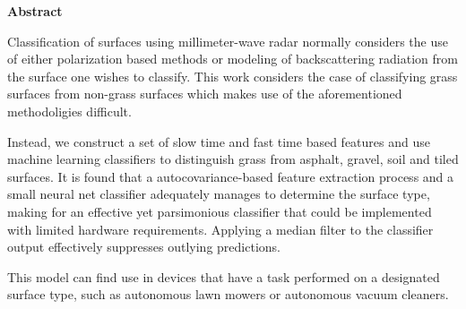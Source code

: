 \newenvironment{abstract}%
    {\cleardoublepage\thispagestyle{empty}\null\vfill\begin{center}%
    \bfseries{\textsf{Abstract}}\end{center}}%
    {\vfill\null}
\begin{abstract}
Classification of surfaces using millimeter-wave radar normally considers the use of either polarization based methods or modeling of backscattering radiation from the surface one wishes to classify. This work considers the case of classifying grass surfaces from non-grass surfaces which makes use of the aforementioned methodoligies difficult. %
		
Instead, we construct a set of slow time and fast time based features and use machine learning classifiers to distinguish grass from asphalt, gravel, soil and tiled surfaces. It is found that a autocovariance-based feature extraction process and a small neural net classifier adequately manages to determine the surface type, making for an effective yet parsimonious classifier that could be implemented with limited hardware requirements. Applying a median filter to the classifier output effectively suppresses outlying predictions.

This model can find use in devices that have a task performed on a designated surface type, such as autonomous lawn mowers or autonomous vacuum cleaners. 


\end{abstract}
